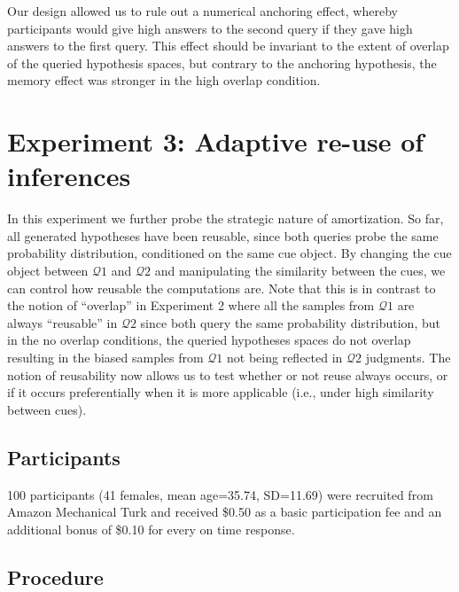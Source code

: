 Our design allowed us to rule out a numerical anchoring effect, whereby participants would give high answers to the second query if they gave high answers to the first query. This effect should be invariant to the extent of overlap of the queried hypothesis spaces, but contrary to the anchoring hypothesis, the memory effect was stronger in the high overlap condition.

\section{Experiment 3: Adaptive re-use of inferences}

In this experiment we further probe the strategic nature of amortization. So far, all generated hypotheses have been reusable, since both queries probe the same probability distribution, conditioned on the same cue object. By changing the cue object between $\mathcal{Q}1$ and $\mathcal{Q}2$ and manipulating the similarity between the cues, we can control how reusable the computations are. Note that this is in contrast to the notion of ``overlap'' in Experiment 2 where all the samples from $\mathcal{Q}1$ are always ``reusable'' in $\mathcal{Q}2$ since both query the same probability distribution, but in the no overlap conditions, the queried hypotheses spaces do not overlap resulting in the biased samples from $\mathcal{Q}1$ not being reflected in $\mathcal{Q}2$ judgments. The notion of reusability now allows us to test whether or not reuse always occurs, or if it occurs preferentially when it is more applicable (i.e., under high similarity between cues).

\subsection{Participants}

100 participants (41 females, mean age=35.74, SD=11.69) were recruited from Amazon Mechanical Turk and received \$0.50 as a basic participation fee and an additional bonus of \$0.10 for every on time response.

\subsection{Procedure}

